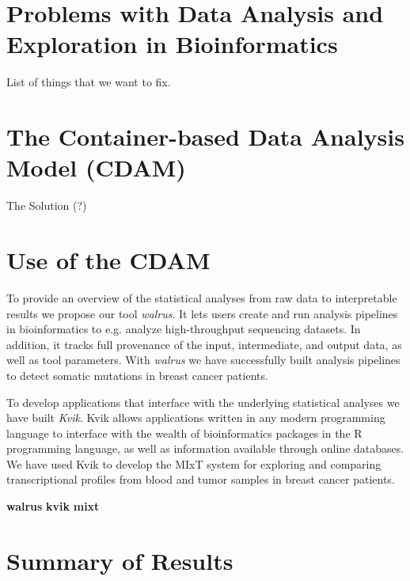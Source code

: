 \section{Problems with Data Analysis and Exploration in Bioinformatics} 
    List of things that we want to fix. 

\section{The Container-based Data Analysis Model (CDAM)} 
    The Solution (?) 

\section{Use of the CDAM} 

To provide an overview of the statistical analyses from raw data to
interpretable results we propose our tool \emph{walrus}. It lets users create
and run analysis pipelines in bioinformatics to e.g. analyze high-throughput
sequencing datasets. In addition, it tracks full provenance of the input,
intermediate, and output data, as well as tool parameters. With \emph{walrus} we
have successfully built analysis pipelines to detect somatic mutations in breast
cancer patients. 

To develop applications that interface with the underlying statistical analyses
we have built \emph{Kvik}. Kvik allows applications written in any modern
programming language to interface with the wealth of bioinformatics packages in
the R programming language, as well as information available through online
databases. We have used Kvik to develop the MIxT system for exploring and
comparing transcriptional profiles from blood and tumor samples in breast cancer
patients. 


\textbf{walrus}
\textbf{kvik} 
\textbf{mixt} 

\section{Summary of Results} 

